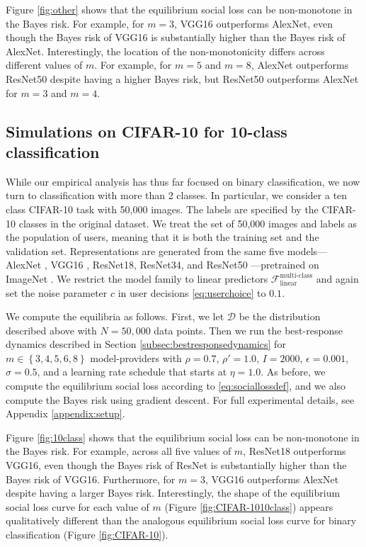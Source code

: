 \documentclass[letterpaper,11pt]{article}
\theoremstyle{plain}
\begin{document}
Figure \ref{fig:other} shows that the equilibrium social loss can be non-monotone in the Bayes risk. For example, for $m = 3$, VGG16 outperforms AlexNet, even though the Bayes risk of VGG16 is substantially higher than the Bayes risk of AlexNet. Interestingly, the location of the non-monotonicity differs across different values of $m$. For example, for $m = 5$ and $m = 8$, AlexNet outperforms ResNet50 despite having a higher Bayes risk, but ResNet50 outperforms AlexNet for $m = 3$ and $m = 4$. 



\subsection{Simulations on CIFAR-10 for 10-class classification}\label{subsec:image10}

While our empirical analysis has thus far focused on binary classification, we now turn to classification with more than 2 classes. In particular, we consider a ten class CIFAR-10 \citep{CIFAR} task with 50,000 images. The labels are specified by the CIFAR-10 classes in the original dataset. We treat the set of 50,000 images and labels as the population of users, meaning that it is both the training set and the validation set. Representations are generated from the same five models---AlexNet \citep{AlexNet}, VGG16 \citep{VGGref}, ResNet18, ResNet34, and ResNet50 \citep{ResNet}---pretrained on ImageNet \citep{ImageNet}. We restrict the model family to linear predictors $\mathcal{F}^{\text{multi-class}}_{\text{linear}}$ and again set the noise parameter $c$ in user decisions \eqref{eq:userchoice} to $0.1$.

We compute the equilibria as follows. First, we let $\mathcal{D}$ be the distribution described above with $N = 50,000$ data points. Then we run the best-response dynamics described in Section \ref{subsec:bestresponsedynamics} for $m \in \left\{3, 4, 5, 6, 8\right\}$ model-providers with $\rho = 0.7$, $\rho' = 1.0$, $I = 2000$, $\epsilon = 0.001$, $\sigma = 0.5$, and a learning rate schedule that starts at $\eta = 1.0$. As before, we compute the equilibrium social loss according to \eqref{eq:sociallossdef}, and we also compute the Bayes risk using gradient descent. For full experimental details, see Appendix \ref{appendix:setup}.  


Figure \ref{fig:10class} shows that the equilibrium social loss can be non-monotone in the Bayes risk. For example, across all five values of $m$, ResNet18 outperforms VGG16, even though the Bayes risk of ResNet is substantially higher than the Bayes risk of VGG16. Furthermore, for $m = 3$, VGG16 outperforms AlexNet despite having a larger Bayes risk. Interestingly, the shape of the equilibrium social loss curve for each value of $m$ (Figure \ref{fig:CIFAR-1010class}) appears qualitatively different than the analogous equilibrium social loss curve for binary classification (Figure \ref{fig:CIFAR-10}). 
\end{document}
